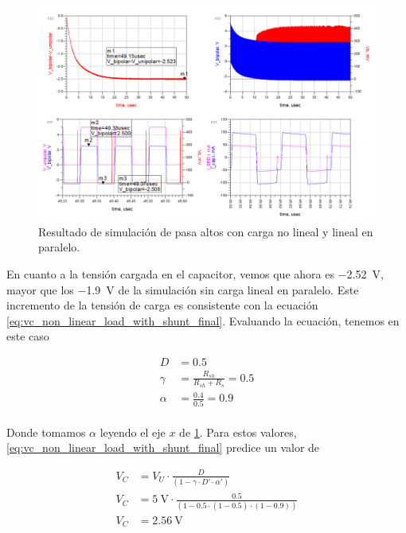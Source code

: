 \begin{figure}[tbp]
    \centering
    \includegraphics[width=\textwidth]{images/highpass_nonlinear_w_shunt_sim_result.png}
    \caption{Resultado de simulación de pasa altos con carga no lineal y lineal
    en paralelo.}
    \label{fig:highpass_non_linear_w_shunt_simulation_result}
\end{figure}

En cuanto a la tensión cargada en el capacitor, vemos que ahora es
\qty{-2.52}{\volt}, mayor que los \qty{-1.9}{\volt} de la simulación sin carga
lineal en paralelo. Este incremento de la tensión de carga es consistente con la
ecuación \ref{eq:vc_non_linear_load_with_shunt_final}. Evaluando la ecuación,
tenemos en este caso

\begin{equation}
    \begin{aligned}
        D &= 0.5 \\
        \gamma &= \frac{R_{sh}}{R_{sh}+R_{s}} =0.5 \\
        \alpha &= \frac{0.4}{0.5} = 0.9 \\
    \end{aligned}
\end{equation}

Donde tomamos $\alpha$ leyendo el eje $x$ de
\ref{fig:highpass_non_linear_w_shunt_simulation_result}. Para estos valores,
\ref{eq:vc_non_linear_load_with_shunt_final} predice un valor de

\begin{equation}
    \begin{aligned}
        V_C &= V_U \cdot \frac{D}{\left( 1 - \gamma \cdot D' \cdot \alpha'\right)} \\
        V_C &= \qty{5}{\volt} \cdot \frac{0.5}{\left( 1 - 0.5 \cdot (1-0.5)
        \cdot (1-0.9) \right)} \\
        V_C &= \qty{2.56}{\volt} \\
    \end{aligned}
\end{equation}

